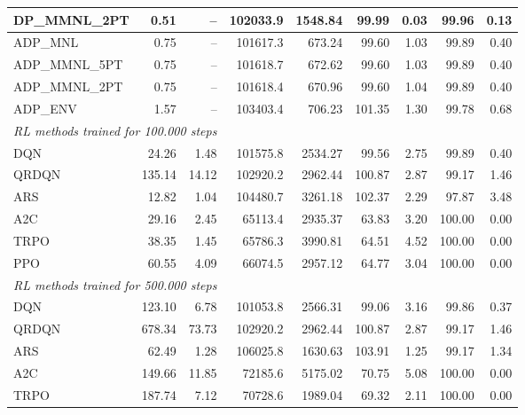 \begin{samepage}
\begin{center}
\begin{tabular}{l|rr|rr|rr|rr}
    DP\_MMNL\_2PT &     0.51 &    -- &   102033.9 &    1548.84 &   99.99 &    0.03 &   99.96 &    0.13 \\
    \midrule
    ADP\_MNL     &     0.75 &    -- &   101617.3 &     673.24 &   99.60 &    1.03 &   99.89 &    0.40 \\
    ADP\_MMNL\_5PT &     0.75 &    -- &   101618.7 &     672.62 &   99.60 &    1.03 &   99.89 &    0.40 \\
    ADP\_MMNL\_2PT &     0.75 &    -- &   101618.4 &     670.96 &   99.60 &    1.04 &   99.89 &    0.40 \\
    ADP\_ENV     &     1.57 &    -- &   103403.4 &     706.23 &  101.35 &    1.30 &   99.78 &    0.68 \\
    \midrule
    \multicolumn{9}{l}{\textit{RL methods trained for 100.000 steps}} \\
    \midrule
    DQN          &    24.26 &     1.48 &   101575.8 &    2534.27 &   99.56 &    2.75 &   99.89 &    0.40 \\
    QRDQN        &   135.14 &    14.12 &   102920.2 &    2962.44 &  100.87 &    2.87 &   99.17 &    1.46 \\
    ARS          &    12.82 &     1.04 &   104480.7 &    3261.18 &  102.37 &    2.29 &   97.87 &    3.48 \\
    A2C          &    29.16 &     2.45 &    65113.4 &    2935.37 &   63.83 &    3.20 &  100.00 &    0.00 \\
    TRPO         &    38.35 &     1.45 &    65786.3 &    3990.81 &   64.51 &    4.52 &  100.00 &    0.00 \\
    PPO          &    60.55 &     4.09 &    66074.5 &    2957.12 &   64.77 &    3.04 &  100.00 &    0.00 \\
    \midrule
    \multicolumn{9}{l}{\textit{RL methods trained for 500.000 steps}} \\
    \midrule
    DQN          &   123.10 &     6.78 &   101053.8 &    2566.31 &   99.06 &    3.16 &   99.86 &    0.37 \\
    QRDQN        &   678.34 &    73.73 &   102920.2 &    2962.44 &  100.87 &    2.87 &   99.17 &    1.46 \\
    ARS          &    62.49 &     1.28 &   106025.8 &    1630.63 &  103.91 &    1.25 &   99.17 &    1.34 \\
    A2C          &   149.66 &    11.85 &    72185.6 &    5175.02 &   70.75 &    5.08 &  100.00 &    0.00 \\
    TRPO         &   187.74 &     7.12 &    70728.6 &    1989.04 &   69.32 &    2.11 &  100.00 &    0.00 \\

\end{tabular}
\end{center}
\end{samepage}
